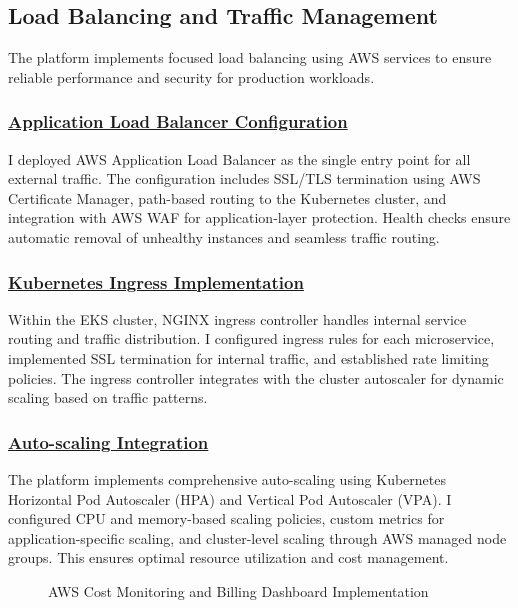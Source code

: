 \subsection{Load Balancing and Traffic Management}
The platform implements focused load balancing using AWS services to ensure reliable performance and security for production workloads.

\subsubsection*{\underline{Application Load Balancer Configuration}}
I deployed AWS Application Load Balancer as the single entry point for all external traffic. The configuration includes SSL/TLS termination using AWS Certificate Manager, path-based routing to the Kubernetes cluster, and integration with AWS WAF for application-layer protection. Health checks ensure automatic removal of unhealthy instances and seamless traffic routing.

\subsubsection*{\underline{Kubernetes Ingress Implementation}}
Within the EKS cluster, NGINX ingress controller handles internal service routing and traffic distribution. I configured ingress rules for each microservice, implemented SSL termination for internal traffic, and established rate limiting policies. The ingress controller integrates with the cluster autoscaler for dynamic scaling based on traffic patterns.

\subsubsection*{\underline{Auto-scaling Integration}}
The platform implements comprehensive auto-scaling using Kubernetes Horizontal Pod Autoscaler (HPA) and Vertical Pod Autoscaler (VPA). I configured CPU and memory-based scaling policies, custom metrics for application-specific scaling, and cluster-level scaling through AWS managed node groups. This ensures optimal resource utilization and cost management.

\begin{figure}[H]
    \centering
    \caption{AWS Cost Monitoring and Billing Dashboard Implementation}
    \label{fig:aws-billing-monitoring}
\end{figure}

